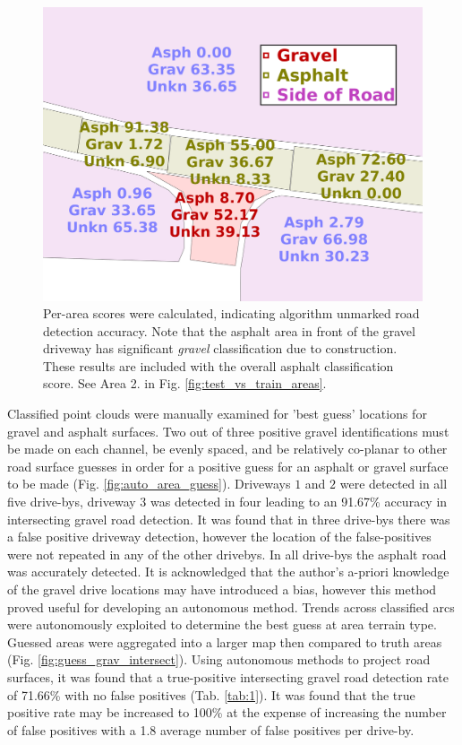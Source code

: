 \documentclass[journal,onecolumn]{IEEEtran}
\begin{document}
		\begin{figure}[H]
			\centering
			\includegraphics[width=0.75\linewidth]{figures/db_4_area_scores_2}
			\caption[Area Scores]{Per-area scores were calculated, indicating algorithm unmarked road detection accuracy. Note that the asphalt area in front of the gravel driveway has significant \textit{gravel} classification due to construction. These results are included with the overall asphalt classification score. See Area 2. in Fig. \ref{fig:test_vs_train_areas}.}
			\label{fig:prepostadjust}
		\end{figure}
	
		{Classified point clouds were manually examined for 'best guess' locations for gravel and asphalt surfaces. Two out of three positive gravel identifications must be made on each channel, be evenly spaced, and be relatively co-planar to other road surface guesses in order for a positive guess for an asphalt or gravel surface to be made (Fig. \ref{fig:auto_area_guess}). Driveways $1$ and $2$ were detected in all five drive-bys, driveway $3$ was detected in four leading to an 91.67\% accuracy in intersecting gravel road detection. It was found that in three drive-bys there was a false positive driveway detection, however the location of the false-positives were not repeated in any of the other drivebys. In all drive-bys the asphalt road was accurately detected. It is acknowledged that the author's a-priori knowledge of the gravel drive locations may have introduced a bias, however this method proved useful for developing an autonomous method. Trends across classified arcs were autonomously exploited to determine the best guess at area terrain type. Guessed areas were aggregated into a larger map then compared to truth areas (Fig. \ref{fig:guess_grav_intersect}). Using autonomous methods to project road surfaces, it was found that a true-positive intersecting gravel road detection rate of 71.66\% with no false positives (Tab. \ref{tab:1}). It was found that the true positive rate may be increased to 100\% at the expense of increasing the number of false positives with a 1.8 average number of false positives per drive-by.}
		
\end{document}
